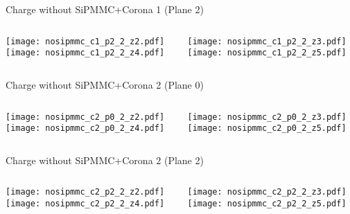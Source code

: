 \documentclass{beamer}
\begin{document}
\begin{frame}{Charge without SiPMMC+Corona 1 (Plane 2)}
	\begin{columns}[onlytextwidth]
		\begin{column}{0.5\textwidth}
			\texttt{[image: nosipmmc\_c1\_p2\_2\_z2.pdf]} \\
			\texttt{[image: nosipmmc\_c1\_p2\_2\_z4.pdf]}
		 \end{column}
		 \begin{column}{0.5\textwidth}
			\texttt{[image: nosipmmc\_c1\_p2\_2\_z3.pdf]} \\
			\texttt{[image: nosipmmc\_c1\_p2\_2\_z5.pdf]}
		 \end{column}
 \end{columns}
\end{frame}


\begin{frame}{Charge without SiPMMC+Corona 2 (Plane 0)}
	\begin{columns}[onlytextwidth]
		\begin{column}{0.5\textwidth}
			\texttt{[image: nosipmmc\_c2\_p0\_2\_z2.pdf]} \\
			\texttt{[image: nosipmmc\_c2\_p0\_2\_z4.pdf]}
		 \end{column}
		 \begin{column}{0.5\textwidth}
			\texttt{[image: nosipmmc\_c2\_p0\_2\_z3.pdf]} \\
			\texttt{[image: nosipmmc\_c2\_p0\_2\_z5.pdf]}
		 \end{column}
 \end{columns}
\end{frame}

\begin{frame}{Charge without SiPMMC+Corona 2 (Plane 2)}
	\begin{columns}[onlytextwidth]
		\begin{column}{0.5\textwidth}
			\texttt{[image: nosipmmc\_c2\_p2\_2\_z2.pdf]} \\
			\texttt{[image: nosipmmc\_c2\_p2\_2\_z4.pdf]}
		 \end{column}
		 \begin{column}{0.5\textwidth}
			\texttt{[image: nosipmmc\_c2\_p2\_2\_z3.pdf]} \\
			\texttt{[image: nosipmmc\_c2\_p2\_2\_z5.pdf]}
		 \end{column}
 \end{columns}
\end{frame}
\end{document}
